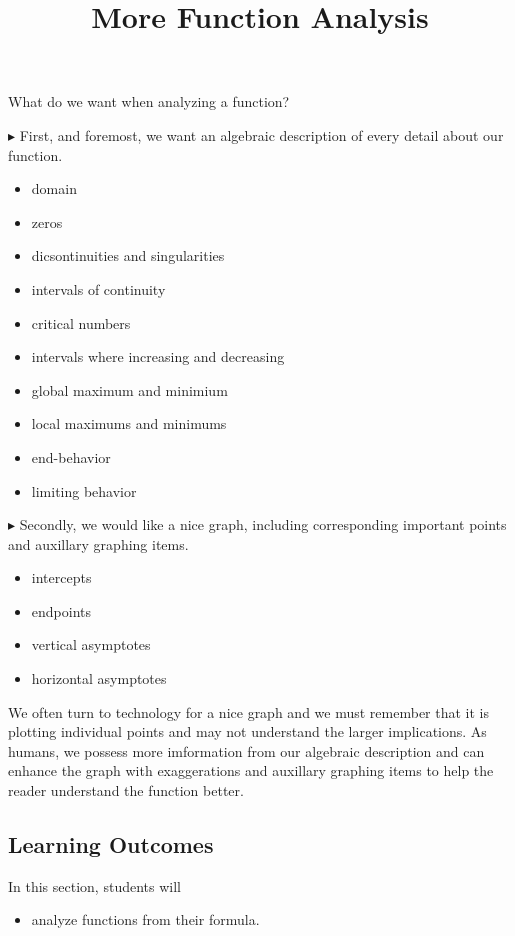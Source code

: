 \documentclass{ximera}
\title{More Function Analysis}
\begin{document}
\begin{abstract}
%
\end{abstract}
\maketitle






What do we want when analyzing a function?


$\blacktriangleright$ First, and foremost, we want an algebraic description of every detail about our function. 

\begin{itemize}
\item domain
\item zeros 
\item dicsontinuities and singularities
\item intervals of continuity
\item critical numbers
\item intervals where increasing and decreasing
\item global maximum and minimium
\item local maximums and minimums
\item end-behavior
\item limiting behavior
\end{itemize}



$\blacktriangleright$ Secondly, we would like a nice graph, including corresponding important points and auxillary graphing items.

\begin{itemize}
	\item intercepts
	\item endpoints
	\item vertical asymptotes
	\item horizontal asymptotes
\end{itemize}




We often turn to technology for a nice graph and we must remember that it is plotting individual points and may not understand the larger implications. As humans, we possess more imformation from our algebraic description and can enhance the graph with exaggerations and auxillary graphing items to help the reader understand the function better.




\subsection{Learning Outcomes}


\begin{sectionOutcomes}
In this section, students will 

\begin{itemize}
\item analyze functions from their formula.
\end{itemize}
\end{sectionOutcomes}
\end{document}

